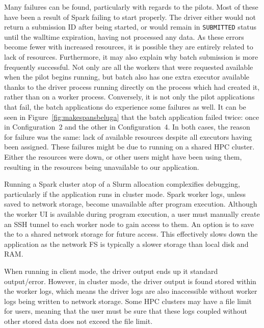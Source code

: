 \documentclass{IEEEtran}
\begin{document}
Many failures can be found, particularly with regards to the pilots. Most
of these have been a result of Spark failing to start properly. The driver
either would not return a submission ID after being started, or would
remain in \texttt{SUBMITTED} status until the walltime expiration, having
not processed any data. As these errors become fewer with increased
resources, it is possible they are entirely related to lack of resources.
Furthermore, it may also explain why batch submission is more frequently successful. Not
only are all the workers that were requested available when the pilot
begins running, but batch also has one extra executor available thanks to the driver
process running directly on the process which had created it, rather than on a
worker process. Conversely, it is not only the pilot applications that
fail, the batch applications do experience some failures as well. It can be
seen in Figure~\ref{fig:makespansbeluga} that the batch application failed
twice: once in Configuration~2 and the other in Configuration~4. In both
cases, the reason for failure was the same: lack of available resources
despite all executors having been assigned. These failures might be due to
running on a shared HPC cluster. Either the resources were down, or other users might
have been using them, resulting in the resources being unavailable to our
application.

Running a Spark cluster atop of a Slurm allocation complexifies debugging, particularly if the application runs in cluster mode.
Spark worker logs, unless saved to network storage, become unavailable after program execution.
Although the worker UI is available during program execution, a user must manually create an SSH tunnel
to each worker node to gain access to them.
An option is to save the to a shared network storage for future access. This effectively slows down
the application as the network FS is typically a slower storage than local disk and RAM.

When running in client mode, the driver output ends up it standard output/error. 
However, in cluster mode, the driver output is found stored within
the worker logs, which means the driver logs are also inaccessible without 
worker logs being written to network storage. Some HPC clusters
may have a file limit for users, meaning that the user must be sure that these 
logs coupled without other stored data does not exceed the file
limit.  
\end{document}
